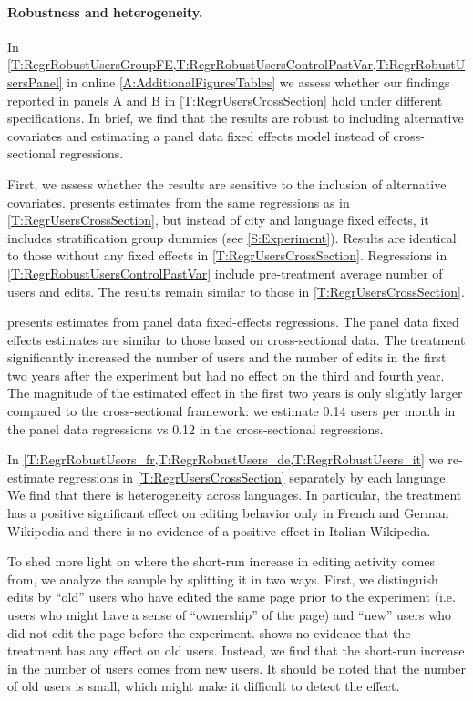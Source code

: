 \documentclass[12pt]{article}
\begin{document}
\paragraph{Robustness and heterogeneity. }%
In \cref{T:RegrRobustUsersGroupFE,T:RegrRobustUsersControlPastVar,T:RegrRobustUsersPanel} in online \cref{A:AdditionalFiguresTables} we assess whether our findings reported in panels A and B in \cref{T:RegrUsersCrossSection} hold under different specifications.
In brief, we find that the results are robust to including alternative covariates and estimating a panel data fixed effects model instead of cross-sectional regressions.

First, we assess whether the results are sensitive to the inclusion of alternative covariates.  presents estimates from the same regressions as in \cref{T:RegrUsersCrossSection}, but instead of city and language fixed effects, it includes stratification group dummies (see \cref{S:Experiment}). Results are identical to those without any fixed effects in \cref{T:RegrUsersCrossSection}. Regressions in \cref{T:RegrRobustUsersControlPastVar} include pre-treatment average number of users and edits. The results remain similar to those in \cref{T:RegrUsersCrossSection}.

 presents estimates from panel data fixed-effects regressions. The panel data fixed effects estimates are similar to those based on cross-sectional data. The treatment significantly increased the number of users and the number of edits in the first two years after the experiment but had no effect on the third and fourth year. The magnitude of the estimated effect in the first two years is only slightly larger compared to the cross-sectional framework: we estimate 0.14 users per month in the panel data regressions vs 0.12 in the cross-sectional regressions.

In \cref{T:RegrRobustUsers_fr,T:RegrRobustUsers_de,T:RegrRobustUsers_it} we re-estimate  regressions in \cref{T:RegrUsersCrossSection} separately by each language. We find that there is heterogeneity across languages. In particular, the treatment has a positive significant effect on editing behavior only in French and German Wikipedia and there is no evidence of a positive effect in Italian Wikipedia. 

To shed more light on where the short-run increase in editing activity comes from, we analyze the sample by splitting it in two ways. First, we distinguish edits by ``old'' users who have edited the same page prior to the experiment (i.e. users who might have a sense of ``ownership'' of the page) and ``new'' users who did not edit the page before the experiment.  shows no evidence that the treatment has any effect on old users. Instead, we find that the short-run increase in the number of users comes from new users. It should be noted that the number of old users is small, which might make it difficult to detect the effect. 
\end{document}

